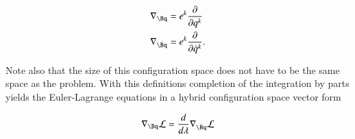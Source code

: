 \documentclass{article}
\newcommand{\LL}[0]{\mathcal{L}}
\newcommand{\qdot}[0]{\dot{q}}
\newcommand{\PD}[2]{\frac{\partial {#2}}{\partial {#1}}}
\newcommand{\grad}[0]{\nabla}
\begin{document}
\begin{align}
\grad_{\Bq} &= e^k \PD{q^k}{} \\
\grad_{\dot{\Bq}} &= e^k \PD{\qdot^k}{}.
\end{align}

Note also that the size of this configuration space does not have to be the same space as the problem.  With this definitions completion of the integration
by parts yields the Euler-Lagrange equations in a hybrid configuration space vector form

\begin{align}
\grad_{\Bq} \LL = \frac{d}{d\lambda} \grad_{\dot{\Bq}} \LL
\end{align}

\end{document}
